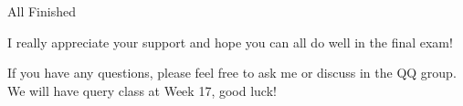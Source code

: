 \documentclass{beamer}
\begin{document}
\begin{frame}{All Finished}
    \begin{LARGE}

    \begin{center}
        I really appreciate your support and hope you can all do well in the final exam!
    \end{center}
\end{LARGE}

\vspace{30pt}
If you have any questions, please feel free to ask me or discuss in the QQ group. We will have query class at Week 17, good luck!

\end{frame}
\end{document}
